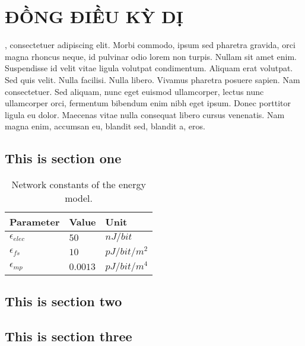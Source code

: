 \chapter{ĐỒNG ĐIỀU KỲ DỊ}

, consectetuer adipiscing elit. Morbi commodo, ipsum sed pharetra gravida, orci magna rhoncus neque, id pulvinar odio lorem non turpis. Nullam sit amet enim. Suspendisse id velit vitae ligula volutpat condimentum. Aliquam erat volutpat. Sed quis velit. Nulla facilisi. Nulla libero. Vivamus pharetra posuere sapien. Nam consectetuer. Sed aliquam, nunc eget euismod ullamcorper, lectus nunc ullamcorper orci, fermentum bibendum enim nibh eget ipsum. Donec porttitor ligula eu dolor. Maecenas vitae nulla consequat libero cursus venenatis. Nam magna enim, accumsan eu, blandit sed, blandit a, eros.

\section{This is section one}
\blindtext

\blinditemize

\begin{table}[tb]
  \centering
  \caption{Network constants of the energy model.}
  \label{tab:network_constants}
  \small
  \begin{tabular}{lll}
    \toprule
    Parameter & Value & Unit \\
    \midrule
    $\epsilon_{elec}$ & $50$ &  $nJ/bit$ \\
    $\epsilon_{fs}$ & $10$ & $pJ/bit/m^2$ \\
    $\epsilon_{mp}$ & $0.0013$ & $pJ/bit/m^4$ \\
    \bottomrule
  \end{tabular}
\end{table} 


\blindmathpaper

\blindtext@formula 

\section{This is section two}
\blindtext
\blindmathpaper

\section{This is section three}
\blindtext
\blindmathpaper
